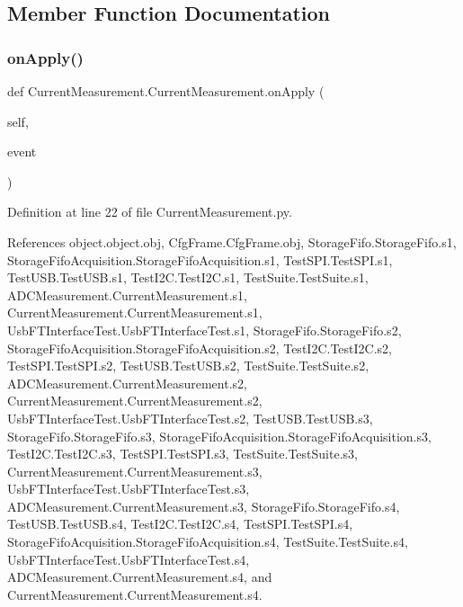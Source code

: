 \subsection{Member Function Documentation}
\mbox{\label{classCurrentMeasurement_1_1CurrentMeasurement_a25af769de641fb09274e8ac719114476}} 
\subsubsection{\texorpdfstring{on\+Apply()}{onApply()}}
{\footnotesize\ttfamily def Current\+Measurement.\+Current\+Measurement.\+on\+Apply (\begin{DoxyParamCaption}\item[{}]{self,  }\item[{}]{event }\end{DoxyParamCaption})}



Definition at line 22 of file Current\+Measurement.\+py.



References object.\+object.\+obj, Cfg\+Frame.\+Cfg\+Frame.\+obj, Storage\+Fifo.\+Storage\+Fifo.\+s1, Storage\+Fifo\+Acquisition.\+Storage\+Fifo\+Acquisition.\+s1, Test\+S\+P\+I.\+Test\+S\+P\+I.\+s1, Test\+U\+S\+B.\+Test\+U\+S\+B.\+s1, Test\+I2\+C.\+Test\+I2\+C.\+s1, Test\+Suite.\+Test\+Suite.\+s1, A\+D\+C\+Measurement.\+Current\+Measurement.\+s1, Current\+Measurement.\+Current\+Measurement.\+s1, Usb\+F\+T\+Interface\+Test.\+Usb\+F\+T\+Interface\+Test.\+s1, Storage\+Fifo.\+Storage\+Fifo.\+s2, Storage\+Fifo\+Acquisition.\+Storage\+Fifo\+Acquisition.\+s2, Test\+I2\+C.\+Test\+I2\+C.\+s2, Test\+S\+P\+I.\+Test\+S\+P\+I.\+s2, Test\+U\+S\+B.\+Test\+U\+S\+B.\+s2, Test\+Suite.\+Test\+Suite.\+s2, A\+D\+C\+Measurement.\+Current\+Measurement.\+s2, Current\+Measurement.\+Current\+Measurement.\+s2, Usb\+F\+T\+Interface\+Test.\+Usb\+F\+T\+Interface\+Test.\+s2, Test\+U\+S\+B.\+Test\+U\+S\+B.\+s3, Storage\+Fifo.\+Storage\+Fifo.\+s3, Storage\+Fifo\+Acquisition.\+Storage\+Fifo\+Acquisition.\+s3, Test\+I2\+C.\+Test\+I2\+C.\+s3, Test\+S\+P\+I.\+Test\+S\+P\+I.\+s3, Test\+Suite.\+Test\+Suite.\+s3, Current\+Measurement.\+Current\+Measurement.\+s3, Usb\+F\+T\+Interface\+Test.\+Usb\+F\+T\+Interface\+Test.\+s3, A\+D\+C\+Measurement.\+Current\+Measurement.\+s3, Storage\+Fifo.\+Storage\+Fifo.\+s4, Test\+U\+S\+B.\+Test\+U\+S\+B.\+s4, Test\+I2\+C.\+Test\+I2\+C.\+s4, Test\+S\+P\+I.\+Test\+S\+P\+I.\+s4, Storage\+Fifo\+Acquisition.\+Storage\+Fifo\+Acquisition.\+s4, Test\+Suite.\+Test\+Suite.\+s4, Usb\+F\+T\+Interface\+Test.\+Usb\+F\+T\+Interface\+Test.\+s4, A\+D\+C\+Measurement.\+Current\+Measurement.\+s4, and Current\+Measurement.\+Current\+Measurement.\+s4.



